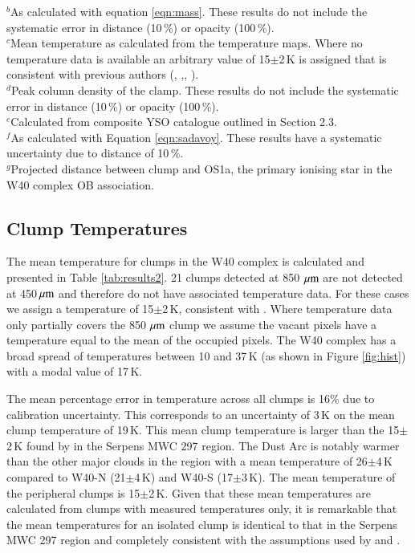 \begin{table*}
$^{b}$As calculated with equation \ref{eqn:mass}. These results do not include the systematic error in distance (10\,\%) or opacity (100\,\%).\\
$^{c}$Mean temperature as calculated from the temperature maps. Where no temperature data is available an arbitrary value of 15$\pm$2\,K is assigned that is consistent with previous authors (\citeauthor{Johnstone:2000fk}\citeyear{Johnstone:2000fk}, \citeauthor{Kirk:2006vn},\citeyear{Kirk:2006vn}, \citeauthor{Rumble:2015vn}\citeyear{Rumble:2015vn}).\\
$^{d}$Peak column density of the clamp. These results do not include the systematic error in distance (10\,\%) or opacity (100\,\%).\\
$^{e}$Calculated from composite YSO catalogue outlined in Section 2.3.\\
$^{f}$As calculated with Equation \ref{eqn:sadavoy}. These results have a systematic uncertainty due to distance of 10\,\%.\\
$^{g}$Projected distance between clump and OS1a, the primary ionising star in the W40 complex OB association. \\
\label{tab:results2}
\end{table*}


\subsection{Clump Temperatures}

The mean temperature for clumps in the W40 complex is calculated and presented in Table \ref{tab:results2}. 
21 clumps detected at 850\,$\,\mu\rm{m}$ are not detected at 450$\,\mu\rm{m}$ and therefore do not have associated 
temperature data. For these cases we assign a temperature of 15$\pm$2\,K, consistent with \cite{Rumble:2015vn}. 
Where temperature data only partially covers the 850\,$\,\mu\rm{m}$ clump we assume the vacant pixels have a 
temperature equal to the mean of the occupied pixels. The W40 complex has a broad spread of temperatures 
between 10 and 37\,K (as shown in Figure \ref{fig:hist}) with a modal value of 17\,K. 

The mean percentage error in temperature across all clumps is 16\% due to calibration uncertainty. This 
corresponds to an uncertainty of 3\,K on the mean clump temperature of 19\,K. This mean clump temperature 
is larger than the 15$\pm$2\,K found by \cite{Rumble:2015vn} in the Serpens MWC 297 region. The Dust 
Arc is notably warmer than the other major clouds in the region with a mean temperature of 26$\pm$4\,K 
compared to W40-N (21$\pm$4\,K) and W40-S (17$\pm$3\,K). The mean temperature of the peripheral 
clumps is 15$\pm$2\,K. Given that these mean temperatures are calculated from clumps with measured 
temperatures only, it is remarkable that the mean temperatures for an isolated clump is identical to that 
in the Serpens MWC 297 region \citep{Rumble:2015vn} and completely consistent with the assumptions 
used by \cite{Johnstone:2000fk} and \cite{Sadavoy:2010ve}. 

